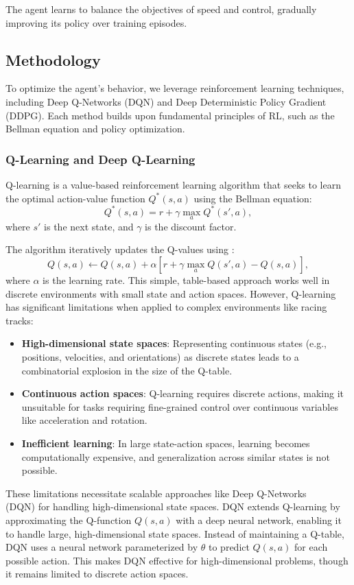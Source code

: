 \documentclass{article}
\begin{document}
The agent learns to balance the objectives of speed and control, gradually improving its policy over training episodes.

\subsection{Methodology}

To optimize the agent’s behavior, we leverage reinforcement learning techniques, including Deep Q-Networks (DQN) and Deep Deterministic Policy Gradient (DDPG). Each method builds upon fundamental principles of RL, such as the Bellman equation and policy optimization.

\subsubsection{Q-Learning and Deep Q-Learning}

Q-learning is a value-based reinforcement learning algorithm that seeks to learn the optimal action-value function \(Q^*(s, a)\) using the Bellman equation:
\[
Q^*(s, a) = r + \gamma \max_a Q^*(s', a),
\]
where \(s'\) is the next state, and \(\gamma\) is the discount factor.

The algorithm iteratively updates the Q-values using \cite{sutton-barton-rl}:
\[
Q(s, a) \leftarrow Q(s, a) + \alpha \left[ r + \gamma \max_a Q(s', a) - Q(s, a) \right],
\]
where \(\alpha\) is the learning rate. This simple, table-based approach works well in discrete environments with small state and action spaces. However, Q-learning has significant limitations when applied to complex environments like racing tracks:
\begin{itemize}
    \item \textbf{High-dimensional state spaces}: Representing continuous states (e.g., positions, velocities, and orientations) as discrete states leads to a combinatorial explosion in the size of the Q-table.
    \item \textbf{Continuous action spaces}: Q-learning requires discrete actions, making it unsuitable for tasks requiring fine-grained control over continuous variables like acceleration and rotation.
    \item \textbf{Inefficient learning}: In large state-action spaces, learning becomes computationally expensive, and generalization across similar states is not possible.
\end{itemize}

These limitations necessitate scalable approaches like Deep Q-Networks\\(DQN) for handling high-dimensional state spaces. 
DQN extends Q-learning by approximating the Q-function \(Q(s, a)\) with a deep neural network, enabling it to handle large, high-dimensional state spaces. 
Instead of maintaining a Q-table, DQN uses a neural network parameterized by \(\theta\) to predict \(Q(s, a)\) for each possible action. This makes DQN effective for high-dimensional problems, though it remains limited to discrete action spaces.
\end{document}
